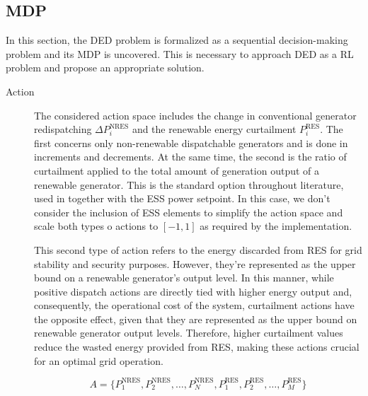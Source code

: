 \subsection{\acf{MDP}} \label{sec:method-mdp}

In this section, the \ac{DED} problem is formalized as a sequential decision-making problem and its \ac{MDP} is uncovered. This is necessary to approach \ac{DED} as a \ac{RL} problem and propose an appropriate solution. 

\begin{description}
	\item[Action] The considered action space includes the change in conventional generator redispatching $\Delta P^\text{NRES}_i$ and the renewable energy curtailment $P^\text{RES}_i$. The first concerns only non-renewable dispatchable generators and is done in increments and decrements. At the same time, the second is the ratio of curtailment applied to the total amount of generation output of a renewable generator. This is the standard option throughout literature, used in \cite{zhaoGraphbasedDeepReinforcement2022, liNovelGraphReinforcement2022, chenScalableGraphReinforcement2023, hanAutonomousControlTechnology2023} together with the \ac{ESS} power setpoint. In this case, we don't consider the inclusion of \ac{ESS} elements to simplify the action space and scale both types o actions to $[-1,1]$ as required by the implementation. \par
	This second type of action refers to the energy discarded from \ac{RES} for grid stability and security purposes. However, they're represented as the upper bound on a renewable generator's output level. In this manner, while positive dispatch actions are directly tied with higher energy output and, consequently, the operational cost of the system, curtailment actions have the opposite effect, given that they are represented as the upper bound on renewable generator output levels. Therefore, higher curtailment values reduce the wasted energy provided from \ac{RES}, making these actions crucial for an optimal grid operation.
	
	\begin{equation} \label{eq:action-space}
		A = \{P^\text{NRES}_1, P^\text{NRES}_2, \dots, P^\text{NRES}_N, P^\text{RES}_1, P^\text{RES}_2, \dots, P^\text{RES}_M\}
	\end{equation}
	

\end{description}

